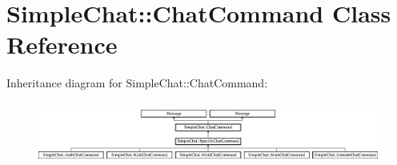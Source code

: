 \hypertarget{classSimpleChat_1_1ChatCommand}{\section{Simple\-Chat\-:\-:Chat\-Command Class Reference}
\label{classSimpleChat_1_1ChatCommand}
}
Inheritance diagram for Simple\-Chat\-:\-:Chat\-Command\-:\begin{figure}[H]
\begin{center}
\leavevmode
\includegraphics[height=2.074074cm]{classSimpleChat_1_1ChatCommand}
\end{center}
\end{figure}
